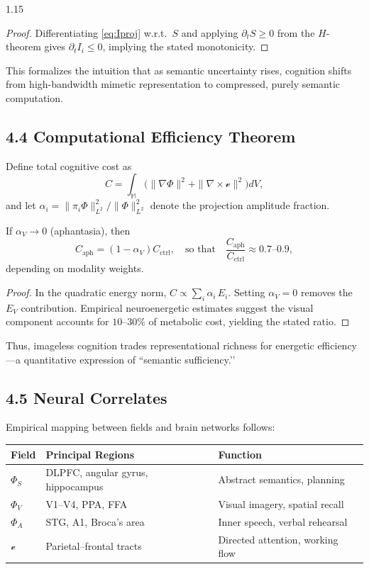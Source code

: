 \documentclass[12pt,a4paper]{article}
\begin{document}
\begin{spacing}{1.15}
\begin{proof}
Differentiating \eqref{eq:Iproj} w.r.t.\ $S$ and applying $\partial_t S\ge0$ from the $H$-theorem gives $\partial_t I_i\le0$, implying the stated monotonicity.
\end{proof}

This formalizes the intuition that as semantic uncertainty rises, cognition shifts from high-bandwidth mimetic representation to compressed, purely semantic computation.

\subsection{4.4 Computational Efficiency Theorem}

Define total cognitive cost as
\begin{equation}
C=\int_{\mathbb{M}}\big(\|\nabla\Phi\|^2+\|\nabla\times\boldsymbol{\mathcal v}\|^2\big)dV,
\end{equation}
and let $\alpha_i=\|\pi_i\Phi\|_{L^2}^2/\|\Phi\|_{L^2}^2$ denote the projection amplitude fraction.

\begin{theorem}
If $\alpha_V\to0$ (aphantasia), then
\[
C_{\text{aph}}=(1-\alpha_V)C_{\text{ctrl}},
\quad
\text{so that}\quad
\frac{C_{\text{aph}}}{C_{\text{ctrl}}}\approx0.7\text{--}0.9,
\]
depending on modality weights.
\]
\end{theorem}

\begin{proof}
In the quadratic energy norm,
$C\propto\sum_i\alpha_i\,E_i$.
Setting $\alpha_V\!=\!0$ removes the $E_V$ contribution.
Empirical neuroenergetic estimates suggest the visual component accounts for $10$–$30$\% of metabolic cost, yielding the stated ratio.
\end{proof}

Thus, imageless cognition trades representational richness for energetic efficiency—a quantitative expression of “semantic sufficiency.’’

\subsection{4.5 Neural Correlates}

Empirical mapping between fields and brain networks follows:

\begin{center}
\begin{tabular}{@{}lll@{}}
\toprule
Field & Principal Regions & Function \\
\midrule
$\Phi_S$ & DLPFC, angular gyrus, hippocampus & Abstract semantics, planning \\
$\Phi_V$ & V1--V4, PPA, FFA & Visual imagery, spatial recall \\
$\Phi_A$ & STG, A1, Broca’s area & Inner speech, verbal rehearsal \\
$\boldsymbol{\mathcal v}$ & Parietal–frontal tracts & Directed attention, working flow \\
\bottomrule
\end{tabular}
\end{center}


\end{spacing}
\end{document}
